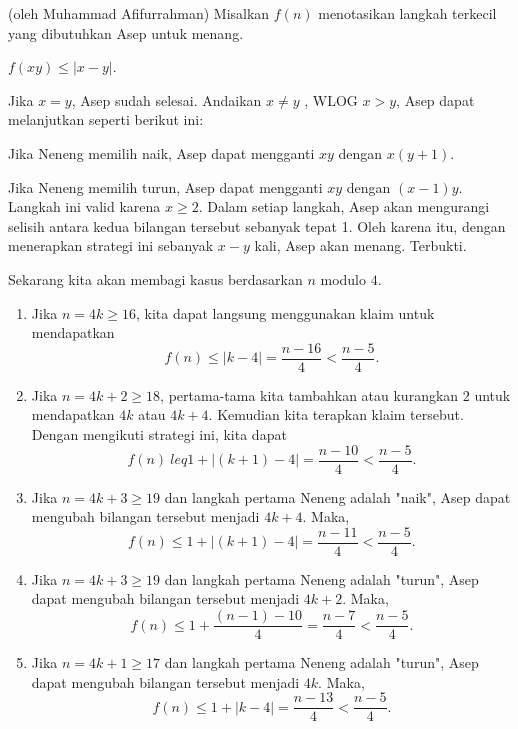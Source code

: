 \begin{solusi}(oleh Muhammad Afifurrahman)
    Misalkan $f(n)$ menotasikan langkah terkecil yang dibutuhkan Asep untuk menang. 

    \begin{claim*}
        $f(xy)\leq |x-y|$. 
        \begin{bukti}
            \item Jika $x=y$, Asep sudah selesai. Andaikan $x \neq y$ , WLOG $x>y$, Asep dapat melanjutkan seperti berikut ini:
            \item Jika Neneng memilih naik, Asep dapat mengganti $xy$ dengan $x(y+1)$.
            \item Jika Neneng memilih turun, Asep dapat mengganti $xy$ dengan $(x-1)y$. Langkah ini valid karena $x\geq 2$.
            Dalam setiap langkah, Asep akan mengurangi selisih antara kedua bilangan tersebut sebanyak tepat 1. Oleh karena itu, dengan menerapkan strategi ini sebanyak $x-y$ kali, Asep akan menang. Terbukti.
        \end{bukti}
    \end{claim*}

    
    Sekarang kita akan membagi kasus berdasarkan $n$ modulo $4$.

\begin{enumerate}
    \item Jika $n=4k\geq 16$, 
    kita dapat langsung menggunakan klaim untuk mendapatkan
    \[f(n) \leq |k-4| = \dfrac{n-16}{4} < \dfrac{n-5}{4}.\]
    
    \item Jika $n=4k+2 \geq 18$,
    pertama-tama kita tambahkan atau kurangkan $2$ untuk mendapatkan $4k$ atau $4k+4$. Kemudian kita terapkan klaim tersebut. Dengan mengikuti strategi ini, kita dapat
    \[f(n) \ leq 1+ |(k+1)-4| = \dfrac{n-10}{4} < \dfrac{n-5}{4}.\]
    
    \item Jika $n=4k+3 \geq 19$ dan langkah pertama Neneng adalah "naik", Asep dapat mengubah bilangan tersebut menjadi $4k+4$. Maka,
    \[f(n) \leq 1+|(k+1)-4| =\dfrac{n-11}{4} < \dfrac{n-5}{4}.\]
    
    \item Jika $n=4k+3 \geq 19$ dan langkah pertama Neneng adalah "turun", Asep dapat mengubah bilangan tersebut menjadi $4k+2$. Maka,
    \[f(n) \leq 1+\dfrac{(n-1)-10}{4} =\dfrac{n-7}{4} < \dfrac{n-5}{4}.\]
    
    \item Jika $n=4k+1 \geq 17$ dan langkah pertama Neneng adalah "turun", 
    Asep dapat mengubah bilangan tersebut menjadi $4k$. Maka,
    \[f(n) \leq 1+|k-4| =\dfrac{n-13}{4} < \dfrac{n-5}{4}.\]
    

\end{enumerate}
\end{solusi}
